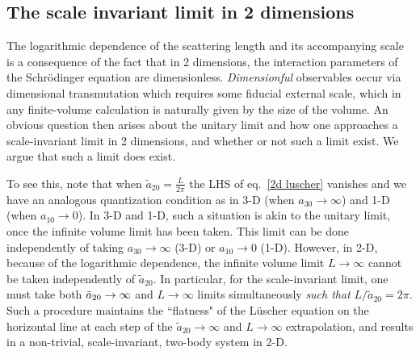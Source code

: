 \subsection{The scale invariant limit in 2 dimensions}
The logarithmic dependence of the scattering length and its accompanying scale is a consequence of the fact that in 2 dimensions, the interaction parameters of the Schr\"odinger equation are dimensionless.  \emph{Dimensionful} observables occur via dimensional transmutation \cite{} which requires some fiducial external scale, which in any finite-volume calculation is naturally given by the size of the volume.  An obvious question then arises about the unitary limit and how one approaches a scale-invariant limit in 2 dimensions, and whether or not such a limit exist.  We argue that such a limit does exist.

To see this, note that when $\tilde a_{20}=\frac{L}{2\pi}$ the LHS of eq.~\eqref{2d luscher} vanishes and we have an analogous quantization condition as in 3-D (when $a_{30}\to\infty$) and 1-D (when $a_{10}\to 0$).  In 3-D and 1-D, such a situation is akin to the unitary limit, once the infinite volume limit has been taken.  This limit can be done independently of taking $a_{30}\to\infty$ (3-D) or $a_{10}\to0$ (1-D).  However, in 2-D, because of the logarithmic dependence, the infinite volume limit $L\to\infty$ cannot be taken independently of $\tilde a_{20}$.  In particular, for the scale-invariant limit, one must take both $\tilde a_{20}\rightarrow \infty$ and $L\to\infty$ limits simultaneously \emph{such that} $L/\tilde a_{20}=2\pi$.  Such a procedure maintains the ``flatness" of the L\"uscher equation on the horizontal line at each step of the $\tilde a_{20}\to\infty$ and $L\to\infty$ extrapolation, and results in a non-trivial, scale-invariant, two-body system in 2-D.  
